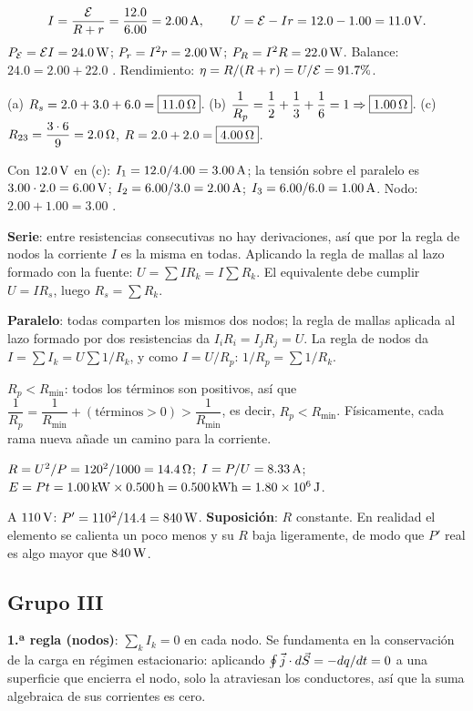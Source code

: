\[
I=\frac{\fem}{R+r}=\frac{12.0}{6.00}=2.00\uu A,\qquad U=\fem-Ir=12.0-1.00=11.0\uu V.
\]
$P_\fem=\fem I=24.0\uu W$; $P_r=I^2r=2.00\uu W$; $P_R=I^2R=22.0\uu W$. Balance: $24.0=2.00+22.0$ \checkmark. Rendimiento: $\eta=R/(R+r)=U/\fem=91.7\%$.

(a) $R_s=2.0+3.0+6.0=\boxed{11.0\ohm}$. \quad (b) $\dfrac1{R_p}=\dfrac12+\dfrac13+\dfrac16=1\Rightarrow\boxed{1.00\ohm}$. \quad (c) $R_{23}=\dfrac{3\cdot6}{9}=2.0\ohm$, $R=2.0+2.0=\boxed{4.00\ohm}$.

Con $12.0\uu V$ en (c): $I_1=12.0/4.00=3.00\uu A$; la tensión sobre el paralelo es $3.00\cdot2.0=6.00\uu V$; $I_2=6.00/3.0=2.00\uu A$; $I_3=6.00/6.0=1.00\uu A$. Nodo: $2.00+1.00=3.00$ \checkmark.

\textbf{Serie}: entre resistencias consecutivas no hay derivaciones, así que por la regla de nodos la corriente $I$ es la misma en todas. Aplicando la regla de mallas al lazo formado con la fuente: $U=\sum IR_k=I\sum R_k$. El equivalente debe cumplir $U=IR_s$, luego $R_s=\sum R_k$.

\textbf{Paralelo}: todas comparten los mismos dos nodos; la regla de mallas aplicada al lazo formado por dos resistencias da $I_iR_i=I_jR_j=U$. La regla de nodos da $I=\sum I_k=U\sum 1/R_k$, y como $I=U/R_p$: $1/R_p=\sum1/R_k$.

\textbf{$R_p<R_{\min}$}: todos los términos son positivos, así que $\dfrac1{R_p}=\dfrac1{R_{\min}}+(\text{términos}>0)>\dfrac1{R_{\min}}$, es decir, $R_p<R_{\min}$. Físicamente, cada rama nueva añade un camino para la corriente.

$R=U^2/P=120^2/1000=14.4\ohm$; $I=P/U=8.33\uu A$; $E=Pt=1.00\uu{kW}\times0.500\uu h=0.500\uu{kWh}=1.80\times10^6\uu J$.

A $110\uu V$: $P'=110^2/14.4=840\uu W$. \textbf{Suposición}: $R$ constante. En realidad el elemento se calienta un poco menos y su $R$ baja ligeramente, de modo que $P'$ real es algo mayor que $840\uu W$.

\subsection*{Grupo III}
\textbf{1.ª regla (nodos)}: $\sum_kI_k=0$ en cada nodo. Se fundamenta en la conservación de la carga en régimen estacionario: aplicando $\oint\vj\cdot d\vec S=-dq/dt=0$ a una superficie que encierra el nodo, solo la atraviesan los conductores, así que la suma algebraica de sus corrientes es cero.

